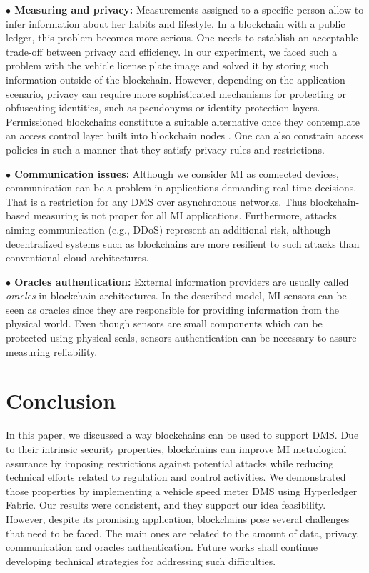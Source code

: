 \documentclass[journal]{IEEEtran}
\begin{document}

\textbf{$\bullet$ Measuring and privacy:} Measurements assigned to a specific person allow to infer information about her habits and lifestyle. 
In a blockchain with a public ledger, this problem becomes more serious. 
One needs to establish an acceptable trade-off between privacy and efficiency.
In our experiment, we faced such a problem with the vehicle license plate image and solved it by storing such information outside of the blockchain.
However, depending on the application scenario, privacy can require more sophisticated mechanisms for protecting or obfuscating identities, such as pseudonyms or identity protection layers. 
Permissioned blockchains constitute a suitable alternative once they contemplate an access control layer built into blockchain nodes \cite{Vukolic2016}. 
One can also constrain access policies in such a manner that they satisfy privacy rules and restrictions.

\textbf{$\bullet$ Communication issues:} Although we consider MI as connected devices, communication can be a problem in applications demanding real-time decisions. 
That is a restriction for any DMS over asynchronous networks. 
Thus blockchain-based measuring is not proper for all MI applications. 
Furthermore, attacks aiming communication (e.g., DDoS) represent an additional risk, although decentralized systems such as blockchains are more resilient to such attacks than conventional cloud architectures.

\textbf{$\bullet$ Oracles authentication:} External information providers are usually called \emph{oracles} in blockchain architectures. 
In the described model, MI sensors can be seen as oracles since they are responsible for providing information from the physical world. 
Even though sensors are small components which can be protected using physical seals, sensors authentication can be necessary to assure measuring reliability.

\section{Conclusion}
In this paper, we discussed a way blockchains can be used to support DMS.
Due to their intrinsic security properties, blockchains can improve MI metrological assurance by imposing restrictions against potential attacks while reducing technical efforts related to regulation and control activities.
We demonstrated those properties by implementing a vehicle speed meter DMS using Hyperledger Fabric.
Our results were consistent, and they support our idea feasibility. 
However, despite its promising application, blockchains pose several challenges that need to be faced. 
The main ones are related to the amount of data, privacy, communication and oracles authentication. 
Future works shall continue developing technical strategies for addressing such difficulties.
\end{document}
